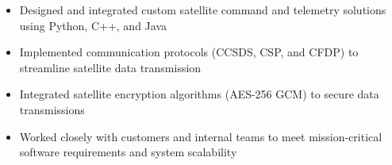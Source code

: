 \par\bigskip
{}
\par\smallskip
\begin{minipage}{13.75cm}
  \begin{minipage}{6.5cm}
    \begin{itemize}
      \item Designed and integrated custom satellite command and telemetry solutions using Python, C++, and Java
      \item Implemented communication protocols (CCSDS, CSP, and CFDP) to streamline satellite data transmission
    \end{itemize}
  \end{minipage}
  \hfill
  \begin{minipage}{6.5cm}
    \begin{itemize}
      \item Integrated satellite encryption algorithms (AES-256 GCM) to secure data transmissions
      \item Worked closely with customers and internal teams to meet mission-critical software requirements and system scalability
    \end{itemize}
  \end{minipage}
\end{minipage}
\par\smallskip
\divider

